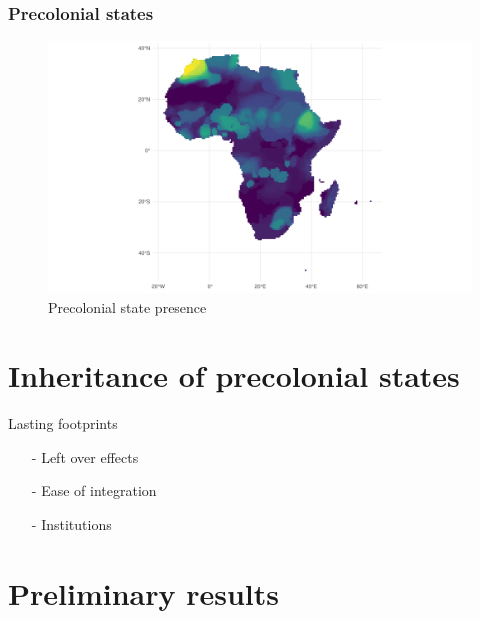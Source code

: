 \documentclass{beamer}
\begin{document}
\begin{frame}
\frametitle{Precolonial states} 

\begin{figure}[htpb]
	\centering
	\includegraphics[width=\linewidth]{../R/Output/sqrtSpAll.pdf}
	\caption{Precolonial state presence}%
	\label{sp}
\end{figure}
\end{frame}

%

\section{Inheritance of precolonial states}

\begin{frame}{Lasting footprints}

\begin{itemize}
	\item[-] Left over effects \pause
	\item[-] Ease of integration \pause
	\item[-] Institutions
\end{itemize}	

\end{frame}

\section{Preliminary results}
\end{document}
